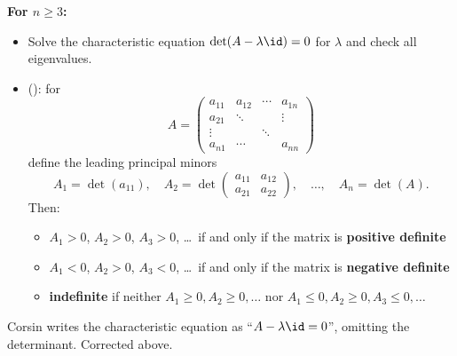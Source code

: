 \textbf{For $n \geq 3$:}
\begin{itemize}
  \item Solve the characteristic equation $\det(A - \lambda\id) = 0$ for $\lambda$ and check all
    eigenvalues.
  \item {} (): for
    \[A = \begin{pmatrix} a_{11} & a_{12} & \cdots & a_{1n} \\ a_{21} & \ddots & & \vdots \\ \vdots & & \ddots & \\ a_{n1} & \cdots & & a_{nn}\end{pmatrix}\]
    define the leading principal minors
    \[A_1 = \det(a_{11}), \quad A_2 = \det\begin{pmatrix} a_{11} & a_{12} \\ a_{21} & a_{22}\end{pmatrix}, \quad \dots, \quad A_n = \det(A).\]
    Then:
    \begin{itemize}
      \item $A_1 > 0$, $A_2 > 0$, $A_3 > 0$, \ldots\ if and only if the matrix is \textbf{positive definite}
      \item $A_1 < 0$, $A_2 > 0$, $A_3 < 0$, \ldots\ if and only if the matrix is \textbf{negative definite}
      \item \textbf{indefinite} if neither $A_1 \geq 0, A_2 \geq 0, \dots$ nor
        $A_1 \leq 0, A_2 \geq 0, A_3 \leq 0, \dots$
    \end{itemize}
\end{itemize}

\begin{ainote}
Corsin writes the characteristic equation as ``$A - \lambda\id = 0$'', omitting the determinant.
Corrected above.
\end{ainote}

